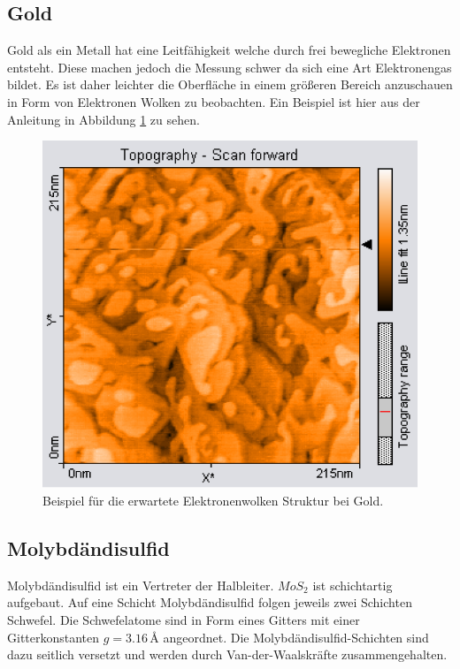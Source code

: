 \subsection{Gold}
Gold als ein Metall hat eine Leitfähigkeit welche durch frei bewegliche Elektronen entsteht. Diese machen jedoch die Messung schwer da sich eine Art Elektronengas bildet. Es ist daher leichter die Oberfläche in einem größeren Bereich anzuschauen in Form von Elektronen Wolken zu beobachten. Ein Beispiel ist hier aus der Anleitung\cite{anleitung} in Abbildung \ref{GoldBsp} zu sehen.
\begin{figure}[ht]
\includegraphics[scale=0.5]{Bild/GoldBsp}
\centering
\caption{Beispiel für die erwartete Elektronenwolken Struktur bei Gold.}
\label{GoldBsp}
\end{figure} 
\subsection{Molybdändisulfid}
Molybdändisulfid ist ein Vertreter der Halbleiter. $MoS_2$ ist schichtartig aufgebaut.
Auf eine Schicht Molybdändisulfid folgen jeweils zwei Schichten Schwefel. Die
Schwefelatome sind in Form eines Gitters mit einer Gitterkonstanten $g = 3.16$\,\AA
angeordnet. Die Molybdändisulfid-Schichten sind dazu seitlich versetzt und werden durch
Van-der-Waalskräfte zusammengehalten.

